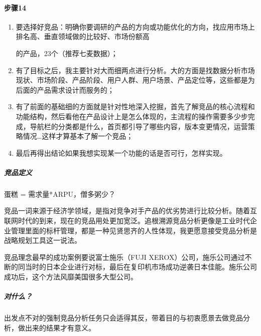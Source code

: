 \documentclass[letterpaper,11pt,english]{sphinxmanual}
\begin{document}
\paragraph{步骤14\sphinxfootnotemark[451]}
\label{\detokenize{chapter_knowledge/goods_analysis:id8}}%
\begin{footnotetext}[451]\sphinxAtStartFootnote
{}
%
\end{footnotetext}\ignorespaces \begin{enumerate}
%
\item {} 
要选择好竞品：明确你要调研的产品的方向或功能优化的方向，找应用市场上排名高、垂直领域做的比较好、市场份额高%
\begin{footnote}[452]\sphinxAtStartFootnote
{}
%
\end{footnote}的产品，2\sphinxhyphen{}3个（推荐七麦数据）；

\item {} 
有了目标之后，我主要针对大而细两点进行分析。大的方面是找数据分析市场现状、市场阶段、产品阶段、用户人群、用户场景、产品定位等，这些都是为后面的产品需求设计而服务的；

\item {} 
有了前面的基础细的方面就是针对性地深入挖掘，首先了解竞品的核心流程和功能结构，然后看他在产品设计上是怎么体现的，主流程的操作需要多少步完成，导航栏的分类都是什么，首页都引导了哪些内容，版本变更情况，运营策略情况…这样才算基本了解一个竞品；

\item {} 
最后再得出结论如果我想实现某一个功能的话是否可行，怎样实现。

\end{enumerate}


\subparagraph{竞品定义}
\label{\detokenize{chapter_knowledge/goods_analysis:id9}}
蛋糕 = 需求量*ARPU，僧多粥少？

竞品一词来源于经济学领域，是指对竞争对手产品的优劣势进行比较分析。随着互联网时代的到来，现在的竞品用处更加宽泛。追根溯源竞品分析更像是工业时代企业管理里面的标杆管理，都是一种见贤思齐的人性体现，我更愿意接受竞品分析是战略规划工具这一说法。

竞品理念最早的成功案例要说富士施乐（FUJI
XEROX）公司，施乐公司通过不断的同当时的日本企业进行对标，最后在复印机市场成功逆袭日本佳能。施乐公司成功后，这个方法风靡美国很多大型公司。


\subparagraph{对什么？}
\label{\detokenize{chapter_knowledge/goods_analysis:id10}}
出发点不对的强制竞品分析任务只会适得其反，带着目的与初衷愿景去做竞品分析，做出来的结果才有意义。
\end{document}
